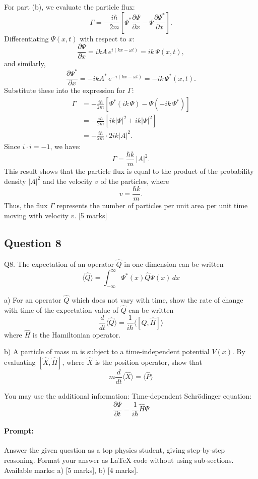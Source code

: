 \documentclass{article}
\begin{document}
For part (b), we evaluate the particle flux:
\[
\Gamma = -\frac{i\hbar}{2m} \left[ \Psi^* \frac{\partial \Psi}{\partial x} - \Psi \frac{\partial \Psi^*}{\partial x} \right].
\]
Differentiating \(\Psi(x,t)\) with respect to \(x\):
\[
\frac{\partial \Psi}{\partial x} = i k A\, e^{i(kx - \omega t)} = i k\, \Psi(x,t),
\]
and similarly,
\[
\frac{\partial \Psi^*}{\partial x} = -i k A^*\, e^{-i(kx - \omega t)} = -i k\, \Psi^*(x,t).
\]
Substitute these into the expression for \(\Gamma\):
\[
\begin{aligned}
\Gamma &= -\frac{i\hbar}{2m} \left[ \Psi^*(i k\, \Psi) - \Psi(-i k\, \Psi^*) \right] \\
&= -\frac{i\hbar}{2m} \left[ i k |\Psi|^2 + i k |\Psi|^2 \right] \\
&= -\frac{i\hbar}{2m} \cdot 2i k |A|^2.
\end{aligned}
\]
Since \(i \cdot i = -1\), we have:
\[
\Gamma = \frac{\hbar k}{m}\, |A|^2.
\]
This result shows that the particle flux is equal to the product of the probability density \(|A|^2\) and the velocity \(v\) of the particles, where 
\[
v = \frac{\hbar k}{m}.
\]
Thus, the flux \(\Gamma\) represents the number of particles per unit area per unit time moving with velocity \(v\). \hfill [5 marks]

\subsection{Question 8}

Q8.  
The expectation of an operator $\hat{Q}$ in one dimension can be written  
\[
\langle \hat{Q} \rangle = \int_{-\infty}^{\infty} \Psi^*(x) \hat{Q} \Psi(x) \, dx
\]

a) For an operator $\hat{Q}$ which does not vary with time, show the rate of change with time of the expectation value of $\hat{Q}$ can be written  
\[
\frac{d}{dt} \langle \hat{Q} \rangle = \frac{1}{i\hbar} \langle [\hat{Q}, \hat{H}] \rangle
\]  
where $\hat{H}$ is the Hamiltonian operator.

b) A particle of mass $m$ is subject to a time-independent potential $V(x)$. By evaluating $[\hat{X}, \hat{H}]$, where $\hat{X}$ is the position operator, show that  
\[
m \frac{d}{dt} \langle \hat{X} \rangle = \langle \hat{P} \rangle
\]

You may use the additional information:  
Time-dependent Schrödinger equation:  
\[
\frac{\partial \Psi}{\partial t} = \frac{1}{i\hbar} \hat{H} \Psi
\]


\paragraph{Prompt: \\} 
Answer the given question as a top physics student, giving step-by-step reasoning. Format your answer as LaTeX code without using sub-sections. Available marks: a) [5 marks], b) [4 marks].
\end{document}
